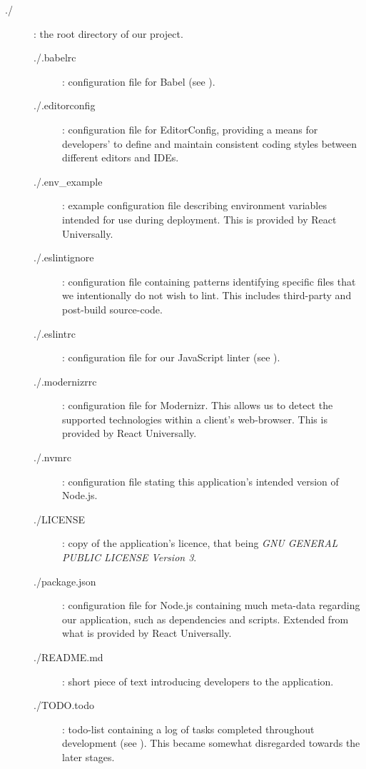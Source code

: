 \documentclass{standalone}
\begin{document}
		\begin{formal}
			\begin{description}
				\item[./]: the root directory of our project.
				\begin{description}
		        	\item[./.babelrc]: configuration file for Babel (see ).

		        	\item[./.editorconfig]: configuration file for EditorConfig, providing a means for developers' to define and maintain consistent coding styles between different editors and IDEs.

		        	\item[./.env\_example]: example configuration file describing environment variables intended for use during deployment. This is provided by React Universally.

		        	\item[./.eslintignore]: configuration file containing patterns identifying specific files that we intentionally do not wish to lint. This includes third-party and post-build source-code.

		        	\item[./.eslintrc]: configuration file for our JavaScript linter (see ).

		        	\item[./.modernizrrc]: configuration file for Modernizr. This allows us to detect the supported technologies within a client's web-browser. This is provided by React Universally.

		        	\item[./.nvmrc]: configuration file stating this application's intended version of Node.js.

		        	\item[./LICENSE]: copy of the application's licence, that being \emph{GNU GENERAL PUBLIC LICENSE Version 3}.

		        	\item[./package.json]: configuration file for Node.js containing much meta-data regarding our application, such as dependencies and scripts. Extended from what is provided by React Universally.

		        	\item[./README.md]: short piece of text introducing developers to the application.

		        	\item[./TODO.todo]: todo-list containing a log of tasks completed throughout development (see ). This became somewhat disregarded towards the later stages.


\end{description}
\end{description}
\end{formal}
\end{document}
